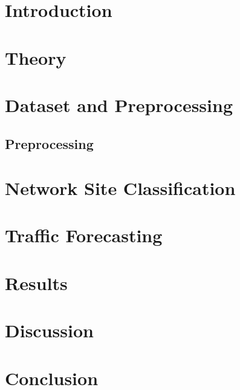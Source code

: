 \documentclass[12pt]{article}
\begin{document}
\tableofcontents
\newpage



\section{Introduction}


%

\section{Theory}

\section{Dataset and Preprocessing}

\subsection{Preprocessing}




\section{Network Site Classification}


\section{Traffic Forecasting}


\section{Results}


\section{Discussion}


\section{Conclusion}





\end{document}
